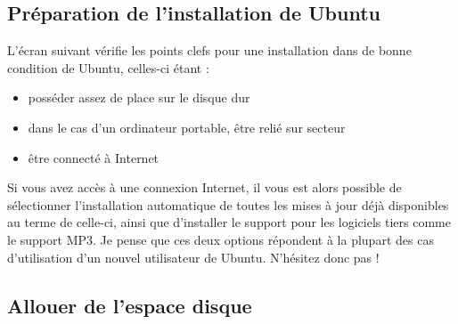 \subsection{Préparation de l'installation de Ubuntu}
L'écran suivant vérifie les points clefs pour une installation dans de bonne condition de Ubuntu, celles-ci étant :
\begin{itemize}
\item posséder assez de place sur le disque dur
\item dans le cas d'un ordinateur portable, être relié sur secteur
\item être connecté à Internet
\end{itemize}
Si vous avez accès à une connexion Internet, il vous est alors possible de sélectionner l'installation automatique de toutes les mises à jour déjà disponibles au terme de celle-ci, ainsi que d'installer le support pour les logiciels tiers comme le support MP3. Je pense que ces deux options répondent à la plupart des cas d'utilisation d'un nouvel utilisateur de Ubuntu. N'hésitez donc pas !
\subsection{Allouer de l'espace disque}
\label{RefFormatPartition}

